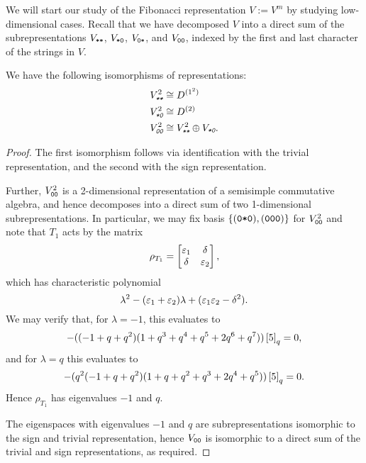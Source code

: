 \documentclass{amsart}
\begin{document}
We will start our study of the Fibonacci representation $V := V^m$ by studying low-dimensional cases.
Recall that we have decomposed $V$ into a direct sum of the subrepresentations $V_{\texttt{*}\texttt{*}}$, $V_{\texttt{*}\texttt{0}}$, $V_{\texttt{0}\texttt{*}}$, and $V_{\texttt{0}\texttt{0}}$, indexed by the first and last character of the strings in $V$.
\begin{proposition}
  We have the following isomorphisms of representations:
  \begin {align*}
    \emph{$V_{\texttt{*}\texttt{*}}^2$} &\cong D^{(1^2)}\\
    \emph{$V_{\texttt{*}\texttt{0}}^2$} &\cong D^{(2)}\\
    \emph{$V_{\texttt{0}\texttt{0}}^2$} &\cong \emph{$V_{\texttt{*}\texttt{*}}^2 \oplus V_{\texttt{*}\texttt{0}}$}.
  \end{align*}
\end{proposition}
\begin{proof}
  The first isomorphism follows via identification with the trivial representation, and the second with the sign representation.

  Further, $V_{\texttt{0}\texttt{0}}^2$ is a 2-dimensional representation of a semisimple commutative algebra, and hence decomposes into a direct sum of two 1-dimensional subrepresentations.
  In particular, we may fix basis $\left\{ (\texttt{0}\texttt{*}\texttt{0}),(\texttt{0}\texttt{0}\texttt{0}) \right\}$ for $V_{\texttt{0}\texttt{0}}^2$ and note that $T_1$ acts by the matrix
  \[
    \rho_{T_1} = \begin{bmatrix}
      \varepsilon_1 & \delta\\
      \delta & \varepsilon_2
    \end{bmatrix},
  \]
  which has characteristic polynomial \[\lambda^2 - (\varepsilon_1 + \varepsilon_2)\lambda +(\varepsilon_1\varepsilon_2 - \delta^2).\]
  We may verify that, for $\lambda = -1$, this evaluates to
  \[
    -((-1 + q + q^2) (1 + q^3 + q^4 + q^5 + 2 q^6 + q^7))\left[ 5 \right]_q = 0,
  \]
  and for $\lambda = q$ this evaluates to 
  \[
  -(q^2 (-1 + q + q^2) (1 + q + q^2 + q^3 + 2 q^4 + q^5)) \left[ 5 \right]_q = 0.
  \]
  Hence $\rho_{T_1}$ has eigenvalues $-1$ and $q$.

  The eigenspaces with eigenvalues $-1$ and $q$ are subrepresentations isomorphic to the sign and trivial representation, hence $V_{\texttt{0}\texttt{0}}$ is isomorphic to a direct sum of the trivial and sign representations, as required.
\end{proof}
\end{document}
